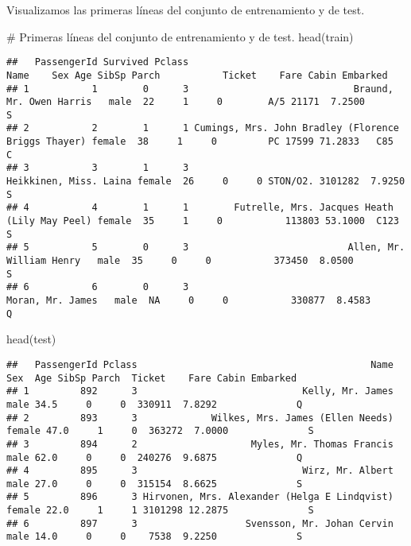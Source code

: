 \documentclass[
]{article}
\newenvironment{Shaded}{\begin{snugshade}}{\end{snugshade}}
\newcommand{\CommentTok}[1]{\textcolor[rgb]{0.50,0.62,0.50}{#1}}
\newcommand{\KeywordTok}[1]{\textcolor[rgb]{0.94,0.87,0.69}{#1}}
\newcommand{\NormalTok}[1]{\textcolor[rgb]{0.80,0.80,0.80}{#1}}
\begin{document}
Visualizamos las primeras líneas del conjunto de entrenamiento y de
test.

\begin{Shaded}
\begin{Highlighting}[]
\CommentTok{# Primeras líneas del conjunto de entrenamiento y de test.}
\KeywordTok{head}\NormalTok{(train)}
\end{Highlighting}
\end{Shaded}

\begin{verbatim}
##   PassengerId Survived Pclass                                                Name    Sex Age SibSp Parch           Ticket    Fare Cabin Embarked
## 1           1        0      3                             Braund, Mr. Owen Harris   male  22     1     0        A/5 21171  7.2500              S
## 2           2        1      1 Cumings, Mrs. John Bradley (Florence Briggs Thayer) female  38     1     0         PC 17599 71.2833   C85        C
## 3           3        1      3                              Heikkinen, Miss. Laina female  26     0     0 STON/O2. 3101282  7.9250              S
## 4           4        1      1        Futrelle, Mrs. Jacques Heath (Lily May Peel) female  35     1     0           113803 53.1000  C123        S
## 5           5        0      3                            Allen, Mr. William Henry   male  35     0     0           373450  8.0500              S
## 6           6        0      3                                    Moran, Mr. James   male  NA     0     0           330877  8.4583              Q
\end{verbatim}

\begin{Shaded}
\begin{Highlighting}[]
\KeywordTok{head}\NormalTok{(test)}
\end{Highlighting}
\end{Shaded}

\begin{verbatim}
##   PassengerId Pclass                                         Name    Sex  Age SibSp Parch  Ticket    Fare Cabin Embarked
## 1         892      3                             Kelly, Mr. James   male 34.5     0     0  330911  7.8292              Q
## 2         893      3             Wilkes, Mrs. James (Ellen Needs) female 47.0     1     0  363272  7.0000              S
## 3         894      2                    Myles, Mr. Thomas Francis   male 62.0     0     0  240276  9.6875              Q
## 4         895      3                             Wirz, Mr. Albert   male 27.0     0     0  315154  8.6625              S
## 5         896      3 Hirvonen, Mrs. Alexander (Helga E Lindqvist) female 22.0     1     1 3101298 12.2875              S
## 6         897      3                   Svensson, Mr. Johan Cervin   male 14.0     0     0    7538  9.2250              S
\end{verbatim}
\end{document}
